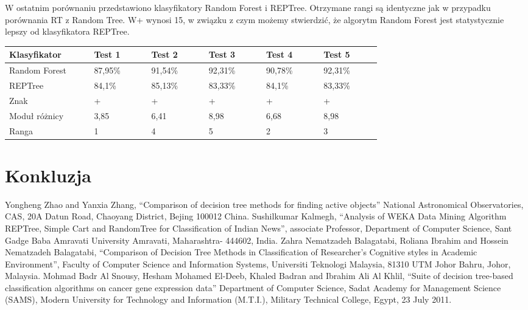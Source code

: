 \documentclass[conference]{IEEEtran}
\begin{document}
W ostatnim porównaniu przedstawiono klasyfikatory Random Forest i REPTree. Otrzymane rangi są identyczne jak w przypadku porównania RT z Random Tree. W+ wynosi 15, w związku z czym możemy stwierdzić, że algorytm Random Forest jest statystycznie lepszy od klasyfikatora REPTree.

\begin{table}[H]

	\begin{tabular}{|p{0.16\linewidth}|p{0.11\linewidth}|p{0.11\linewidth}|p{0.11\linewidth}|p{0.11\linewidth}|p{0.11\linewidth}|}%
	\hline\centering
	Klasyfikator 	& Test 1 & Test 2 & Test 3 & Test 4 & Test 5 \\ \hline\centering
	Random Forest	& 87,95\% & 91,54\% & 92,31\% & 90,78\% & 92,31\% \\ \hline\centering
	REPTree	& 84,1\% & 85,13\% & 83,33\% & 84,1\% & 83,33\% \\ \hline\centering
	Znak	& + & + & + & + & + \\ \hline\centering
	Moduł różnicy  & 3,85 & 6,41 & 8,98 & 6,68 & 8,98  \\ \hline\centering
	Ranga	& 1 & 4 & 5 & 2 & 3 \\ \hline
	\end{tabular}
\end{table}

\section{Konkluzja}

\begin{thebibliography}{00}
 Yongheng Zhao and Yanxia Zhang, ``Comparison of decision tree methods for finding active objects'' National Astronomical Observatories, CAS, 20A Datun Road, Chaoyang District, Bejing 100012 China.
 Sushilkumar Kalmegh, ``Analysis of WEKA Data Mining Algorithm REPTree, Simple Cart and RandomTree for Classification of Indian News'', associate Professor, Department of Computer Science, Sant Gadge Baba Amravati University
Amravati, Maharashtra- 444602, India.
 Zahra Nematzadeh Balagatabi, Roliana Ibrahim and Hossein Nematzadeh Balagatabi, ``Comparison of Decision Tree Methods in Classification of Researcher’s Cognitive styles in Academic Environment'', Faculty of Computer Science and Information Systems, Universiti Teknologi Malaysia, 81310 UTM Johor Bahru, Johor, Malaysia.
 Mohmad Badr Al Snousy, Hesham Mohamed El-Deeb, Khaled Badran and Ibrahim Ali Al Khlil, ``Suite of decision tree-based classification algorithms on cancer gene expression data'' Department of Computer Science, Sadat Academy for Management Science (SAMS), Modern University for Technology and Information (M.T.I.),  Military Technical College, Egypt, 23 July 2011.
\end{thebibliography}
\end{document}
